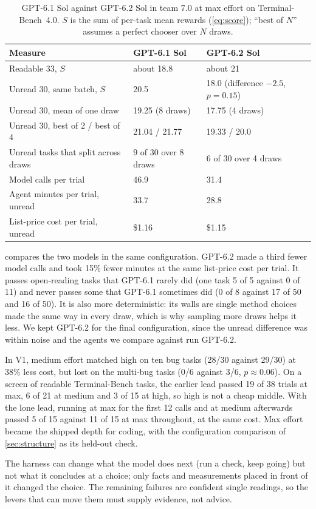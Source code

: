\begin{table}[t]
\centering
\small
\caption{GPT-6.1 Sol against GPT-6.2 Sol in team 7.0 at max effort on Terminal-Bench~4.0. $S$ is
the sum of per-task mean rewards (\cref{eq:score}); ``best of $N$'' assumes a perfect chooser over
$N$ draws.}
\label{tab:models}
\begin{tabular}{@{}lll@{}}
\toprule
Measure & GPT-6.1 Sol & GPT-6.2 Sol \\
\midrule
Readable 33, $S$ & about 18.8 & about 21 \\
Unread 30, same batch, $S$ & 20.5 & 18.0 (difference $-2.5$, $p = 0.15$) \\
Unread 30, mean of one draw & 19.25 (8 draws) & 17.75 (4 draws) \\
Unread 30, best of 2 / best of 4 & 21.04 / 21.77 & 19.33 / 20.0 \\
Unread tasks that split across draws & 9 of 30 over 8 draws & 6 of 30 over 4 draws \\
Model calls per trial & 46.9 & 31.4 \\
Agent minutes per trial, unread & 33.7 & 28.8 \\
List-price cost per trial, unread & \$1.16 & \$1.15 \\
\bottomrule
\end{tabular}
\end{table}

  compares the two models in the same
configuration. GPT-6.2 made a third fewer model calls and took 15\% fewer minutes at the same
list-price cost per trial. It passes open-reading tasks that GPT-6.1 rarely did (one task 5 of 5
against 0 of 11) and never passes some that GPT-6.1 sometimes did (0 of 8 against 17 of 50 and 16
of 50). It is also more deterministic: its walls are single method choices made the same way in
every draw, which is why sampling more draws helps it less. We kept GPT-6.2 for the final
configuration, since the unread difference was within noise and the agents we compare against run
GPT-6.2.

 In V1, medium effort matched high on ten bug tasks (28/30 against 29/30) at 38\%
less cost, but lost on the multi-bug tasks (0/6 against 3/6, $p \approx 0.06$). On a screen of
readable Terminal-Bench tasks, the earlier lead passed 19 of 38 trials at max, 6 of 21 at medium
and 3 of 15 at high, so high is not a cheap middle. With the lone lead, running at max for the
first 12 calls and at medium afterwards passed 5 of 15 against 11 of 15 at max throughout, at the
same cost. Max effort became the shipped depth for
coding, with the configuration comparison of \cref{sec:structure} as its held-out check.

 The harness can change what the model does next (run a check, keep going) but
not what it concludes at a choice; only facts and measurements placed in front of it changed the
choice. The remaining failures are confident single readings, so the levers that can move them must
supply evidence, not advice.
